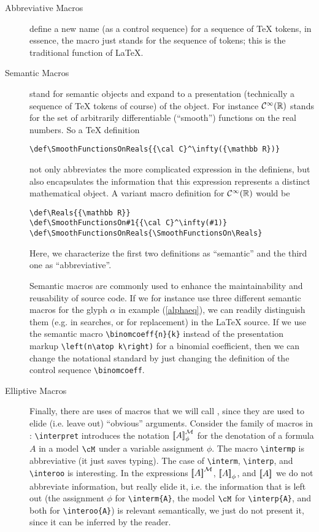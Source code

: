 \begin{description}
\item[Abbreviative Macros] define a new name (as a control sequence) for a sequence of
  {\TeX} tokens, in essence, the macro just stands for the sequence of tokens; this is the
  traditional function of {\LaTeX}.
\item[Semantic Macros] stand for semantic objects and expand to a presentation
  (technically a sequence of {\TeX} tokens of course) of the object. For instance
  ${\cal C}^\infty({\mathbb R})$ stands for the set of arbitrarily differentiable
  (``smooth'') functions on the real numbers. So a {\TeX} definition
  \begin{footnotesize}
\begin{verbatim}
\def\SmoothFunctionsOnReals{{\cal C}^\infty({\mathbb R})}
\end{verbatim}
\end{footnotesize}
not only abbreviates the more complicated expression in the definiens, but also
encapsulates the information that this expression represents a distinct
mathematical object. A variant macro definition for ${\cal C}^\infty({\mathbb R})$
would be
\begin{center}\footnotesize
\begin{verbatim}
\def\Reals{{\mathbb R}}
\def\SmoothFunctionsOn#1{{\cal C}^\infty(#1)}
\def\SmoothFunctionsOnReals{\SmoothFunctionsOn\Reals}
\end{verbatim}
\end{center}
Here, we characterize the first two definitions as ``semantic'' and the third one
as ``abbreviative''.
 
Semantic macros are commonly used to enhance the maintainability and reusability
of source code. If we for instance use three different semantic macros for the
glyph $\alpha$ in example (\ref{alphaeq}), we can readily distinguish them (e.g.
in searches, or for replacement) in the {\LaTeX} source. If we use the semantic
macro {\verb|\binomcoeff{n}{k}|} instead of the presentation markup
{\verb|\left(n\atop k\right)|} for a binomial coefficient, then we can change the
notational standard by just changing the definition of the control sequence
{\verb|\binomcoeff|}.

\item[Elliptive Macros] Finally, there are uses of macros that we will call
  {}, since they are used to elide (i.e. leave out) ``obvious''
  arguments.  Consider the family of macros in {}:
  {\verb|\interpret|} introduces the notation ${\left[\kern-0.18em\left[A\right]\kern-0.18em\right]^{{\cal M}}_{\phi}}$ for the denotation of
  a formula $A$ in a model $\cM$ under a variable assignment $\phi$. The macro
  {\verb|\intermp|} is abbreviative (it just saves typing).  The case of
  {\verb|\interm|}, {\verb|\interp|}, and {\verb|\interoo|} is interesting. In the
  expressions ${\left[\kern-0.18em\left[A\right]\kern-0.18em\right]^{{\cal M}}_{}}$, ${\left[\kern-0.18em\left[A\right]\kern-0.18em\right]^{}_{\phi}}$, and ${\left[\kern-0.18em\left[A\right]\kern-0.18em\right]^{}_{}}$ we do not abbreviate
  information, but really elide it, i.e. the information that is left out (the
  assignment $\phi$ for {\verb|\interm{A}|}, the model $\cM$ for
  {\verb|\interp{A}|}, and both for {\verb|\interoo{A}|}) is relevant
  semantically, we just do not present it, since it can be inferred by the reader.


\end{description}
